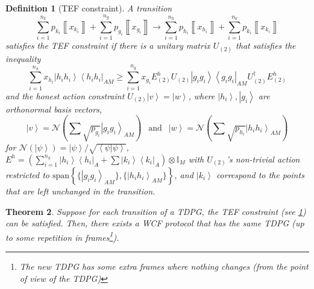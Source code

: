 \documentclass{article}
\newtheorem{theorem}{Theorem}\newtheorem{lemma}[theorem]{Lemma}\newtheorem{proposition}[theorem]{Proposition}\newtheorem{corollary}[theorem]{Corollary}\newtheorem{definition}[theorem]{Definition}\newtheorem{claim}[theorem]{Claim}\newtheorem{remark}[theorem]{Remark}\newtheorem{example}[theorem]{Example}
\begin{document}
%

\begin{definition}[TEF constraint]\label{def:TEFconstraint} A transition
  \begin{equation}
    \sum_{i=1}^{n_{k}}p_{k_{i}}\left\llbracket x_{k_{i}}\right\rrbracket +\sum_{i=1}^{n_{g}}p_{g_{i}}\left\llbracket x_{g_{i}}\right\rrbracket \to\sum_{i=1}^{n_{h}}p_{h_{i}}\left\llbracket x_{h_{i}}\right\rrbracket +\sum_{i=1}^{n_{k}}p_{k_{i}}\left\llbracket x_{k_{i}}\right\rrbracket \label{eq:transitionForTEF}
  \end{equation}
  satisfies the \emph{TEF constraint} if there is a unitary matrix $U_{(2)}$ that satisfies the inequality
  \begin{equation}
    \sum_{i=1}^{n_{h}}x_{h_{i}}\left|h_{i}h_{i}\right\rangle \left\langle h_{i}h_{i}\right|_{AM}\ge\sum_{i=1}^{n_{g}}x_{g_{i}}E_{(2)}^{h}U_{(2)}\left|g_{i}g_{i}\right\rangle \left\langle g_{i}g_{i}\right|_{AM}U^\dagger_{(2)}E_{(2)}^{h}\label{eq:ProtocolConstraintEquation}
  \end{equation}
  and the honest action constraint
  $
    U_{(2)}\left|v\right\rangle =\left|w\right\rangle
  $,
  where ${{\left|h_{i}\right\rangle},{\left|g_{i}\right\rangle}}$
  are orthonormal basis vectors,
  \begin{displaymath}
    \left|v\right\rangle =\mathcal{N}\left(\sum\sqrt{p_{g_{i}}}\left|g_{i}g_{i}\right\rangle _{AM}\right)\ \
    \text{ and }\ \
    \left|w\right\rangle =\mathcal{N}\left(\sum\sqrt{p_{h_{i}}}\left|h_{i}h_{i}\right\rangle _{AM}\right)
  \end{displaymath}
  for $\mathcal{N}(\left|\psi\right\rangle )=\left|\psi\right\rangle /\sqrt{\left\langle \psi|\psi\right\rangle }$,
  $E^{h}=\left(\sum_{i=1}^{n_{h}}\left|h_{i}\right\rangle \left\langle h_{i}\right|_{A}+\sum\left|k_{i}\right\rangle \left\langle k_{i}\right|_{A}\right)\otimes\mathbb{I}_{M}$
  with $U_{(2)}$'s non-trivial action restricted to $\text{span}\left\{ \{\left|g_{i}g_{i}\right\rangle _{AM}\},\{\left|h_{i}h_{i}\right\rangle _{AM}\}\right\} $,
  and $\left|k_{i}\right\rangle $ correspond to the points that
  are left unchanged in the transition.

\end{definition}


\begin{theorem}\label{thm:TEFconstraint} Suppose for each transition of a TDPG, the TEF constraint (see \cref{def:TEFconstraint}) can be satisfied. Then, there exists a WCF protocol that has the same TDPG (up to some repetition in frames\footnote{The new TDPG has some extra frames where nothing changes (from the point of view of the TDPG)}).
\end{theorem}
\end{document}

